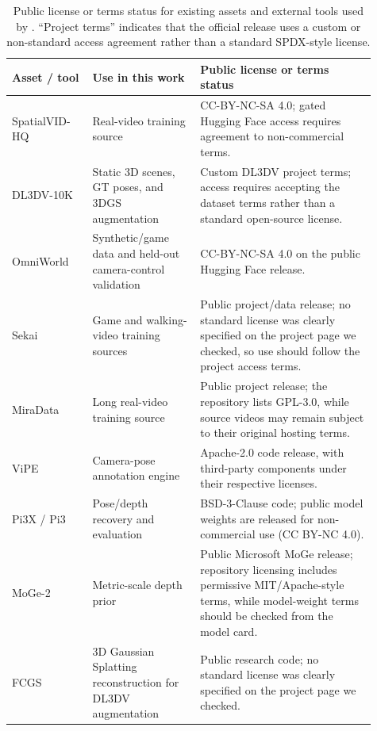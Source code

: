 \begin{table}[t]
  \centering
  \caption{Public license or terms status for existing assets and external tools used by \modelname. ``Project terms'' indicates that the official release uses a custom or non-standard access agreement rather than a standard SPDX-style license.}
  \label{tab:asset_terms}
  \scriptsize
  \setlength{\tabcolsep}{3pt}
  \renewcommand{\arraystretch}{1.08}
  \begin{tabular}{@{}p{0.20\linewidth}p{0.27\linewidth}p{0.44\linewidth}@{}}
    \toprule
    \textbf{Asset / tool} & \textbf{Use in this work} & \textbf{Public license or terms status} \\
    \midrule
    SpatialVID-HQ~\citep{spatialvid} & Real-video training source & CC-BY-NC-SA 4.0; gated Hugging Face access requires agreement to non-commercial terms. \\
    DL3DV-10K~\citep{dl3dv} & Static 3D scenes, GT poses, and 3DGS augmentation & Custom DL3DV project terms; access requires accepting the dataset terms rather than a standard open-source license. \\
    OmniWorld~\citep{omniworld} & Synthetic/game data and held-out camera-control validation & CC-BY-NC-SA 4.0 on the public Hugging Face release. \\
    Sekai~\citep{sekai} & Game and walking-video training sources & Public project/data release; no standard license was clearly specified on the project page we checked, so use should follow the project access terms. \\
    MiraData~\citep{miradata} & Long real-video training source & Public project release; the repository lists GPL-3.0, while source videos may remain subject to their original hosting terms. \\
    ViPE~\citep{vipe} & Camera-pose annotation engine & Apache-2.0 code release, with third-party components under their respective licenses. \\
    Pi3X / Pi3~\citep{pi3x} & Pose/depth recovery and evaluation & BSD-3-Clause code; public model weights are released for non-commercial use (CC BY-NC 4.0). \\
    MoGe-2~\citep{moge2} & Metric-scale depth prior & Public Microsoft MoGe release; repository licensing includes permissive MIT/Apache-style terms, while model-weight terms should be checked from the model card. \\
    FCGS~\citep{fcgs} & 3D Gaussian Splatting reconstruction for DL3DV augmentation & Public research code; no standard license was clearly specified on the project page we checked. \\

\end{tabular}
\end{table}
